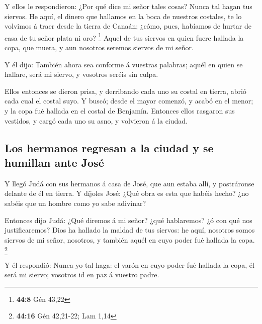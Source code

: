  Y ellos le respondieron: ¿Por qué dice mi señor tales
cosas? Nunca tal hagan tus siervos.  He aquí, el dinero que
hallamos en la boca de nuestros costales, te lo volvimos á traer desde
la tierra de Canaán; ¿cómo, pues, habíamos de hurtar de casa de tu señor
plata ni oro? \footnote{\textbf{44:8} Gén 43,22}  Aquel de
tus siervos en quien fuere hallada la copa, que muera, y aun nosotros
seremos siervos de mi señor.

 Y él dijo: También ahora sea conforme á vuestras palabras;
aquél en quien se hallare, será mi siervo, y vosotros seréis sin culpa.

 Ellos entonces se dieron prisa, y derribando cada uno su
costal en tierra, abrió cada cual el costal suyo.  Y buscó;
desde el mayor comenzó, y acabó en el menor; y la copa fué hallada en el
costal de Benjamín.  Entonces ellos rasgaron sus vestidos,
y cargó cada uno su asno, y volvieron á la ciudad.

\hypertarget{los-hermanos-regresan-a-la-ciudad-y-se-humillan-ante-josuxe9}{%
\subsection{Los hermanos regresan a la ciudad y se humillan ante
José}\label{los-hermanos-regresan-a-la-ciudad-y-se-humillan-ante-josuxe9}}

 Y llegó Judá con sus hermanos á casa de José, que aun
estaba allí, y postráronse delante de él en tierra.  Y
díjoles José: ¿Qué obra es esta que habéis hecho? ¿no sabéis que un
hombre como yo sabe adivinar?

 Entonces dijo Judá: ¿Qué diremos á mi señor? ¿qué
hablaremos? ¿ó con qué nos justificaremos? Dios ha hallado la maldad de
tus siervos: he aquí, nosotros somos siervos de mi señor, nosotros, y
también aquél en cuyo poder fué hallada la copa. \footnote{\textbf{44:16}
  Gén 42,21-22; Lam 1,14}

 Y él respondió: Nunca yo tal haga: el varón en cuyo poder
fué hallada la copa, él será mi siervo; vosotros id en paz á vuestro
padre.

